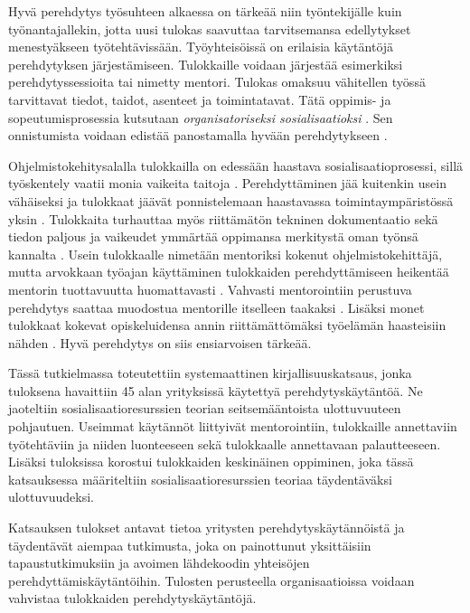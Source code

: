 \documentclass[utf8]{gradu3}
\begin{document}
Hyvä perehdytys työsuhteen alkaessa on tärkeää niin työntekijälle kuin työnantajallekin, jotta uusi tulokas saavuttaa tarvitsemansa edellytykset menestyäkseen työtehtävissään. Työyhteisöissä on erilaisia käytäntöjä perehdytyksen järjestämiseen. Tulokkaille voidaan järjestää esimerkiksi perehdytyssessioita tai nimetty mentori. Tulokas omaksuu vähitellen työssä tarvittavat tiedot, taidot, asenteet ja toimintatavat. Tätä oppimis- ja sopeutumisprosessia kutsutaan \textit{organisatoriseksi sosialisaatioksi} %
\parencites%
    {wanberg-2012}%
    {chao-2012}%
\relax.
%
Sen onnistumista voidaan edistää panostamalla hyvään perehdytykseen %
\parencites%
    {saks-gruman-2012}%
    {bauer-ym-2007}%
    {wanberg-2012}%
\relax.
%

Ohjelmistokehitysalalla tulokkailla on edessään haastava sosialisaatioprosessi, sillä työskentely vaatii monia vaikeita taitoja
%
\parencites%
    [][]{swebok}%
    {gregory-ym-2020}%
    {begel-simon-2008-all-over-again}%
\relax.
%
Perehdyttäminen jää kuitenkin usein vähäiseksi ja tulokkaat jäävät ponnistelemaan haastavassa toimintaympäristössä yksin %
\parencites%
    {buchan-ym-2019}%
    {dagenais-ym-2010}%
    {begel-simon-2008}%
\relax.
%
Tulokkaita turhauttaa myös riittämätön tekninen dokumentaatio \parencite{ju-ym-2021} sekä tiedon paljous ja vaikeudet ymmärtää oppimansa merkitystä oman työnsä kannalta \parencite{viviani-murphy-2019}. Usein tulokkaalle nimetään mentoriksi kokenut ohjelmistokehittäjä, mutta arvokkaan työajan käyttäminen tulokkaiden perehdyttämiseen heikentää mentorin tuottavuutta huomattavasti \parencite{medeiros-2021}. Vahvasti mentorointiin perustuva perehdytys saattaa muodostua mentorille itselleen taakaksi \parencite{viviani-murphy-2019}. Lisäksi monet tulokkaat kokevat opiskeluidensa annin riittämättömäksi työelämän haasteisiin nähden \parencite{craig-ym-2018}. Hyvä perehdytys on siis ensiarvoisen tärkeää.

Tässä tutkielmassa toteutettiin systemaattinen kirjallisuuskatsaus, jonka tuloksena havaittiin 45 alan yrityksissä käytettyä perehdytyskäytäntöä. Ne jaoteltiin sosialisaatioresurssien teorian \textcite{saks-gruman-2012} seitsemääntoista ulottuvuuteen pohjautuen. Useimmat käytännöt liittyivät mentorointiin, tulokkaille annettaviin työtehtäviin ja niiden luonteeseen sekä tulokkaalle annettavaan palautteeseen. Lisäksi tuloksissa korostui tulokkaiden keskinäinen oppiminen, joka tässä katsauksessa määriteltiin sosialisaatioresurssien teoriaa täydentäväksi ulottuvuudeksi.

Katsauksen tulokset antavat tietoa yritysten perehdytyskäytännöistä ja täydentävät aiempaa tutkimusta, joka on painottunut yksittäisiin tapaustutkimuksiin ja avoimen lähdekoodin yhteisöjen perehdyttämiskäytäntöihin. Tulosten perusteella organisaatioissa voidaan vahvistaa tulokkaiden perehdytyskäytäntöjä.
\end{document}
